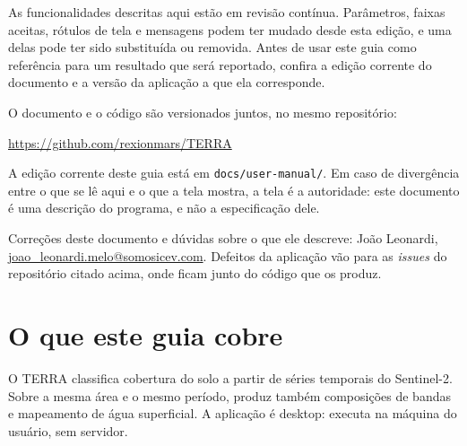 \documentclass[12pt,a4paper]{article}
\begin{document}
\begin{aviso}
As funcionalidades descritas aqui est\~ao em revis\~ao cont\'inua. Par\^ametros,
faixas aceitas, r\'otulos de tela e mensagens podem ter mudado desde esta
edi\c{c}\~ao, e uma delas pode ter sido substitu\'ida ou removida. Antes de
usar este guia como refer\^encia para um resultado que ser\'a reportado,
confira a edi\c{c}\~ao corrente do documento e a vers\~ao da aplica\c{c}\~ao a
que ela corresponde.

O documento e o c\'odigo s\~ao versionados juntos, no mesmo reposit\'orio:

\begin{center}
\url{https://github.com/rexionmars/TERRA}
\end{center}

\noindent A edi\c{c}\~ao corrente deste guia est\'a em
\texttt{docs/user-manual/}. Em caso de diverg\^encia entre o que se l\^e aqui
e o que a tela mostra, a tela \'e a autoridade: este documento \'e uma
descri\c{c}\~ao do programa, e n\~ao a especifica\c{c}\~ao dele.
\end{aviso}

%
%
 Corre\c{c}\~oes deste documento e d\'uvidas sobre o que ele
descreve: Jo\~ao Leonardi, \url{joao_leonardi.melo@somosicev.com}. Defeitos da
aplica\c{c}\~ao v\~ao para as \emph{issues} do reposit\'orio citado acima, onde
ficam junto do c\'odigo que os produz.

\section{O que este guia cobre}

O TERRA classifica cobertura do solo a partir de s\'eries temporais do
Sentinel-2. Sobre a mesma \'area e o mesmo per\'iodo, produz tamb\'em
composi\c{c}\~oes de bandas e mapeamento de \'agua superficial. A
aplica\c{c}\~ao \'e desktop: executa na m\'aquina do usu\'ario, sem
servidor.
\end{document}
